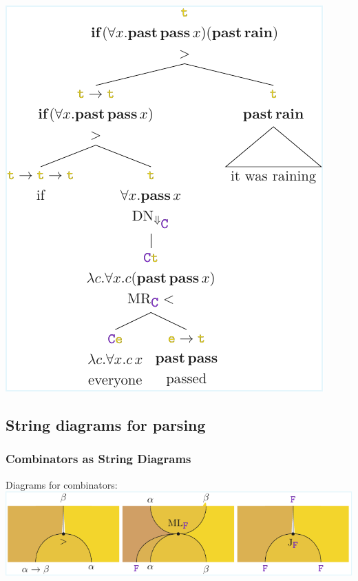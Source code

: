 \documentclass[math, english, info]{beamercours}
\begin{document}
\begin{frame}
	\begin{center}
		\includegraphics[height=.7\pageheight]{aux/figures/parse-tree-3.pdf}
	\end{center}
\end{frame}

\subsection{String diagrams for parsing}
\begin{frame}
	\frametitle{Combinators as String Diagrams}
	Diagrams for combinators:
	\includegraphics[width=\textwidth]{aux/figures/combinators-sd.pdf}
\end{frame}
\end{document}

